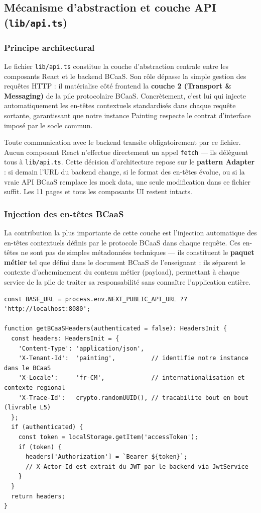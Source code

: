 \documentclass[12pt,a4paper]{report}
\begin{document}
\subsection{Mécanisme d'abstraction et couche API (\texttt{lib/api.ts})}

\subsubsection*{Principe architectural}

Le fichier \texttt{lib/api.ts} constitue la couche d'abstraction centrale
entre les composants React et le backend BCaaS. Son rôle dépasse la simple
gestion des requêtes HTTP : il matérialise côté frontend la \textbf{couche
2 (Transport \& Messaging)} de la pile protocolaire BCaaS. Concrètement,
c'est lui qui injecte automatiquement les en-têtes contextuels standardisés
dans chaque requête sortante, garantissant que notre instance Painting
respecte le contrat d'interface imposé par le socle commun.

Toute communication avec le backend transite obligatoirement par ce fichier.
Aucun composant React n'effectue directement un appel \texttt{fetch} — ils
délèguent tous à \texttt{lib/api.ts}. Cette décision d'architecture repose
sur le \textbf{pattern Adapter} : si demain l'URL du backend change, si le
format des en-têtes évolue, ou si la vraie API BCaaS remplace les mock data,
une seule modification dans ce fichier suffit. Les 11 pages et tous les
composants UI restent intacts.

\subsubsection*{Injection des en-têtes BCaaS}

La contribution la plus importante de cette couche est l'injection
automatique des en-têtes contextuels définis par le protocole BCaaS dans
chaque requête. Ces en-têtes ne sont pas de simples métadonnées techniques
— ils constituent le \textbf{paquet métier} tel que défini dans le document
BCaaS de l'enseignant : ils séparent le contexte d'acheminement du contenu
métier (payload), permettant à chaque service de la pile de traiter sa
responsabilité sans connaître l'application entière.

\begin{lstlisting}[caption={\texttt{lib/api.ts} --- injection des en-têtes contextuels BCaaS}]
const BASE_URL = process.env.NEXT_PUBLIC_API_URL ?? 'http://localhost:8080';

function getBCaaSHeaders(authenticated = false): HeadersInit {
  const headers: HeadersInit = {
    'Content-Type': 'application/json',
    'X-Tenant-Id':  'painting',          // identifie notre instance dans le BCaaS
    'X-Locale':     'fr-CM',             // internationalisation et contexte regional
    'X-Trace-Id':   crypto.randomUUID(), // tracabilite bout en bout (livrable L5)
  };
  if (authenticated) {
    const token = localStorage.getItem('accessToken');
    if (token) {
      headers['Authorization'] = `Bearer ${token}`;
      // X-Actor-Id est extrait du JWT par le backend via JwtService
    }
  }
  return headers;
}
\end{lstlisting}
\end{document}
